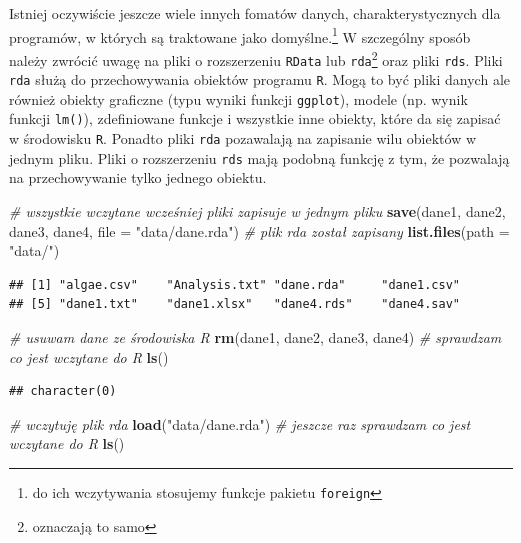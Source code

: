 \documentclass[]{book}
\newenvironment{Shaded}{\begin{snugshade}}{\end{snugshade}}
\newcommand{\CommentTok}[1]{\textcolor[rgb]{0.56,0.35,0.01}{\textit{#1}}}
\newcommand{\DataTypeTok}[1]{\textcolor[rgb]{0.13,0.29,0.53}{#1}}
\newcommand{\KeywordTok}[1]{\textcolor[rgb]{0.13,0.29,0.53}{\textbf{#1}}}
\newcommand{\NormalTok}[1]{#1}
\newcommand{\StringTok}[1]{\textcolor[rgb]{0.31,0.60,0.02}{#1}}
\let\rmarkdownfootnote\footnote%
\def\footnote{\protect\rmarkdownfootnote}
\theoremstyle{plain}
\theoremstyle{definition}
\begin{document}
Istniej oczywiście jeszcze wiele innych fomatów danych, charakterystycznych dla programów, w których są traktowane jako domyślne.\footnote{do ich wczytywania stosujemy funkcje pakietu \texttt{foreign}} W szczególny sposób należy zwrócić uwagę na pliki o rozszerzeniu \texttt{RData} lub \texttt{rda}\footnote{oznaczają to samo} oraz pliki \texttt{rds}. Pliki \texttt{rda} służą do przechowywania obiektów programu \texttt{R}. Mogą to być pliki danych ale również obiekty graficzne (typu wyniki funkcji \texttt{ggplot}), modele (np. wynik funkcji \texttt{lm()}), zdefiniowane funkcje i wszystkie inne obiekty, które da się zapisać w środowisku \texttt{R}. Ponadto pliki \texttt{rda} pozawalają na zapisanie wilu obiektów w jednym pliku. Pliki o rozszerzeniu \texttt{rds} mają podobną funkcję z tym, że pozwalają na przechowywanie tylko jednego obiektu.

\begin{Shaded}
\begin{Highlighting}[]
\CommentTok{# wszystkie wczytane wcześniej pliki zapisuje w jednym pliku}
\KeywordTok{save}\NormalTok{(dane1, dane2, dane3, dane4, }\DataTypeTok{file =} \StringTok{"data/dane.rda"}\NormalTok{)}
\CommentTok{# plik rda został zapisany}
\KeywordTok{list.files}\NormalTok{(}\DataTypeTok{path =} \StringTok{"data/"}\NormalTok{)}
\end{Highlighting}
\end{Shaded}

\begin{verbatim}
## [1] "algae.csv"    "Analysis.txt" "dane.rda"     "dane1.csv"   
## [5] "dane1.txt"    "dane1.xlsx"   "dane4.rds"    "dane4.sav"
\end{verbatim}

\begin{Shaded}
\begin{Highlighting}[]
\CommentTok{# usuwam dane ze środowiska R}
\KeywordTok{rm}\NormalTok{(dane1, dane2, dane3, dane4)}
\CommentTok{# sprawdzam co jest wczytane do R}
\KeywordTok{ls}\NormalTok{()}
\end{Highlighting}
\end{Shaded}

\begin{verbatim}
## character(0)
\end{verbatim}

\begin{Shaded}
\begin{Highlighting}[]
\CommentTok{# wczytuję plik rda}
\KeywordTok{load}\NormalTok{(}\StringTok{"data/dane.rda"}\NormalTok{)}
\CommentTok{# jeszcze raz sprawdzam co jest wczytane do R}
\KeywordTok{ls}\NormalTok{()}
\end{Highlighting}
\end{Shaded}
\end{document}
